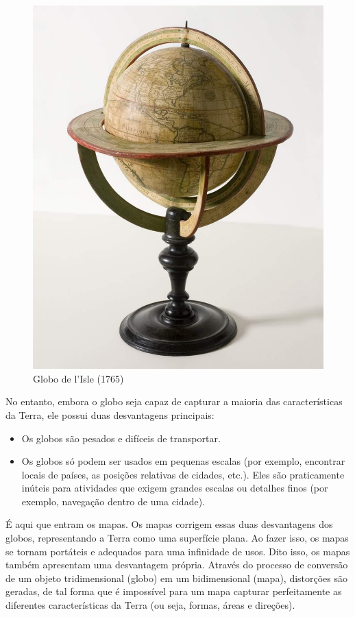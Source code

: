 \documentclass[
]{krantz}
\providecommand{\tightlist}{%
  \setlength{\itemsep}{0pt}\setlength{\parskip}{0pt}}
\begin{document}
\begin{figure}
\centering
\includegraphics{media/modulo0/globe.jpg}
\caption{Globo de l'Isle (1765)}
\end{figure}

No entanto, embora o globo seja capaz de capturar a maioria das características da Terra, ele possui duas desvantagens principais:

\begin{itemize}
\tightlist
\item
  Os globos são pesados e difíceis de transportar.
\item
  Os globos só podem ser usados em pequenas escalas (por exemplo, encontrar locais de países, as posições relativas de cidades, etc.). Eles são praticamente inúteis para atividades que exigem grandes escalas ou detalhes finos (por exemplo, navegação dentro de uma cidade).
\end{itemize}

É aqui que entram os mapas. Os mapas corrigem essas duas desvantagens dos globos, representando a Terra como uma superfície plana. Ao fazer isso, os mapas se tornam portáteis e adequados para uma infinidade de usos. Dito isso, os mapas também apresentam uma desvantagem própria. Através do processo de conversão de um objeto tridimensional (globo) em um bidimensional (mapa), distorções são geradas, de tal forma que é impossível para um mapa capturar perfeitamente as diferentes características da Terra (ou seja, formas, áreas e direções).
\end{document}
